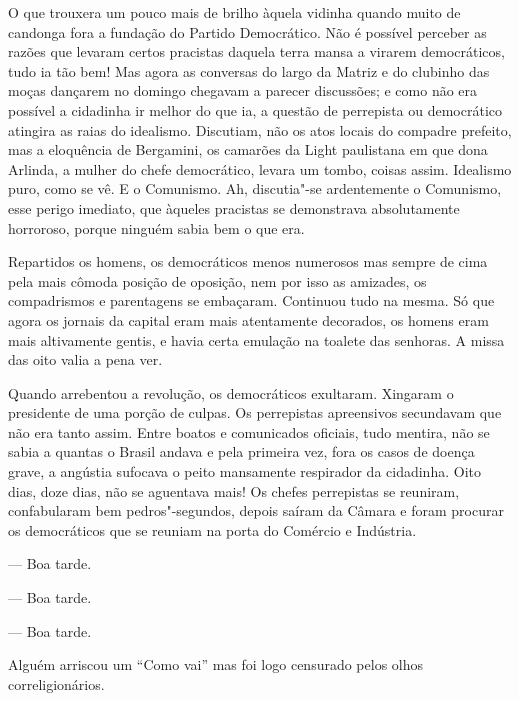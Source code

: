 O que trouxera um pouco mais de brilho àquela vidinha quando muito de
candonga fora a fundação do Partido Democrático. Não é possível perceber
as razões que levaram certos pracistas daquela terra mansa a virarem
democráticos, tudo ia tão bem! Mas agora as conversas do largo da Matriz
e do clubinho das moças dançarem no domingo chegavam a parecer
discussões; e como não era possível a cidadinha ir melhor do que ia, a
questão de perrepista ou democrático atingira as raias do idealismo.
Discutiam, não os atos locais do compadre prefeito, mas a eloquência de
Bergamini, os camarões da Light paulistana em que dona Arlinda, a mulher
do chefe democrático, levara um tombo, coisas assim. Idealismo puro,
como se vê. E o Comunismo. Ah, discutia"-se ardentemente o Comunismo,
esse perigo imediato, que àqueles pracistas se demonstrava absolutamente
horroroso, porque ninguém sabia bem o que era.

Repartidos os homens, os democráticos menos numerosos mas sempre de cima
pela mais cômoda posição de oposição, nem por isso as amizades, os
compadrismos e parentagens se embaçaram. Continuou tudo na mesma. Só que
agora os jornais da capital eram mais atentamente decorados, os homens
eram mais altivamente gentis, e havia certa emulação na toalete das
senhoras. A missa das oito valia a pena ver.

Quando arrebentou a revolução, os democráticos exultaram. Xingaram o
presidente de uma porção de culpas. Os perrepistas apreensivos
secundavam que não era tanto assim. Entre boatos e comunicados oficiais,
tudo mentira, não se sabia a quantas o Brasil andava e pela primeira
vez, fora os casos de doença grave, a angústia sufocava o peito
mansamente respirador da cidadinha. Oito dias, doze dias, não se
aguentava mais! Os chefes perrepistas se reuniram, confabularam bem
pedros"-segundos, depois saíram da Câmara e foram procurar os
democráticos que se reuniam na porta do Comércio e Indústria.

--- Boa tarde.

--- Boa tarde.

--- Boa tarde.

Alguém arriscou um ``Como vai'' mas foi logo censurado pelos olhos
correligionários.

--- Olhem, vamos fazer uma coisa: não vale a pena a gente derramar
sangue, nem estar agora diz que brigando por causa de revolução. O
melhor é fazer assim: se a revolução ganhar, nós entregamos tudo pra
vocês, tomem conta da Câmara, da coletoria, do jornal, tá tudo em dia,
só falta fechar o balanço do mês. Não se deve nada e tem vinte e dois
contos da arrecadação em caixa. Mas se o governo ganhar, continua tudo
na mesma, está feito?

